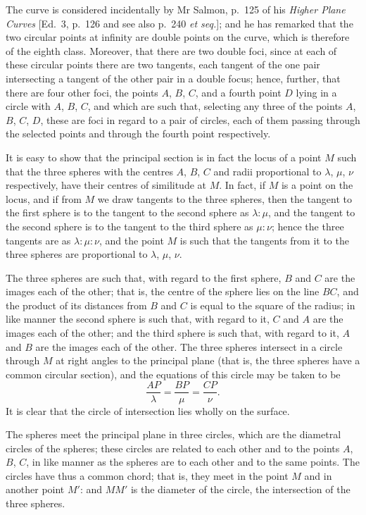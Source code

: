 \documentclass[11pt,a4paper]{article}
\theoremstyle{plain}
\begin{document}
The curve is considered incidentally by Mr Salmon, p.\ 125 of his \textit{Higher Plane Curves} [Ed.\ 3, p.\ 126 and see also p.\ 240 \textit{et seq.}]; and he has remarked that the two circular points at infinity are double points on the curve, which is therefore of the eighth class. Moreover, that there are two double foci, since at each of these circular points there are two tangents, each tangent of the one pair intersecting a tangent of the other pair in a double focus; hence, further, that there are four other foci, the points $A$, $B$, $C$, and a fourth point $D$ lying in a circle with $A$, $B$, $C$, and which are such that, selecting any three of the points $A$, $B$, $C$, $D$, these are foci in regard to a pair of circles, each of them passing through the selected points and through the fourth point respectively.

It is easy to show that the principal section is in fact the locus of a point $M$ such that the three spheres with the centres $A$, $B$, $C$ and radii proportional to $\lambda$, $\mu$, $\nu$ respectively, have their centres of similitude at $M$. In fact, if $M$ is a point on the locus, and if from $M$ we draw tangents to the three spheres, then the tangent to the first sphere is to the tangent to the second sphere as $\lambda : \mu$, and the tangent to the second sphere is to the tangent to the third sphere as $\mu : \nu$; hence the three tangents are as $\lambda : \mu : \nu$, and the point $M$ is such that the tangents from it to the three spheres are proportional to $\lambda$, $\mu$, $\nu$.

\newpage
The three spheres are such that, with regard to the first sphere, $B$ and $C$ are the images each of the other; that is, the centre of the sphere lies on the line $BC$, and the product of its distances from $B$ and $C$ is equal to the square of the radius; in like manner the second sphere is such that, with regard to it, $C$ and $A$ are the images each of the other; and the third sphere is such that, with regard to it, $A$ and $B$ are the images each of the other. The three spheres intersect in a circle through $M$ at right angles to the principal plane (that is, the three spheres have a common circular section), and the equations of this circle may be taken to be
\[
\frac{AP}{\lambda} = \frac{BP}{\mu} = \frac{CP}{\nu}.
\]
It is clear that the circle of intersection lies wholly on the surface.

The spheres meet the principal plane in three circles, which are the diametral circles of the spheres; these circles are related to each other and to the points $A$, $B$, $C$, in like manner as the spheres are to each other and to the same points. The circles have thus a common chord; that is, they meet in the point $M$ and in another point $M'$: and $MM'$ is the diameter of the circle, the intersection of the three spheres.
\end{document}
